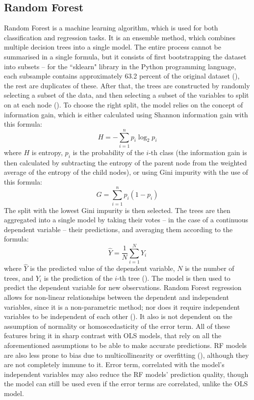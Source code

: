 \documentclass[12pt]{report}
\begin{document}
\subsection{Random Forest}
Random Forest is a machine learning algorithm, which is used for both classification and regression tasks. It is an ensemble method, which combines multiple decision trees into a single model. The entire process cannot be summarised in a single formula, but it consists of first bootstrapping the dataset into subsets -- for the ``sklearn" library in the Python programming language, each subsample contains approximately 63.2 percent of the original dataset (\cite{Steorts15}), the rest are duplicates of these. After that, the trees are constructed by randomly selecting a subset of the data, and then selecting a subset of the variables to split on at each node (\cite[p.160]{cutler2011}). To choose the right split, the model relies on the concept of information gain, which is either calculated using Shannon information gain with this formula:
\begin{equation}
	H = -\sum_{i=1}^{n} p_i \log_2 p_i
\end{equation}
where $H$ is entropy, $p_i$ is the probability of the $i$-th class (the information gain is then calculated by subtracting the entropy of the parent node from the weighted average of the entropy of the child nodes), or using Gini impurity with the use of this formula:
\begin{equation}
	G = \sum_{i=1}^{n} p_i (1 - p_i)
\end{equation}
The split with the lowest Gini impurity is then selected. The trees are then aggregated into a single model by taking their votes -- in the case of a continuous dependent variable -- their predictions, and averaging them according to the formula:
\begin{equation}
	\hat{Y} = \frac{1}{N} \sum_{i=1}^{N} Y_i
\end{equation}
where $\hat{Y}$ is the predicted value of the dependent variable, $N$ is the number of trees, and $Y_i$ is the prediction of the $i$-th tree (\cite[p. 159]{cutler2011}). The model is then used to predict the dependent variable for new observations.
Random Forest regression allows for non-linear relationships between the dependent and independent variables, since it is a non-parametric method; nor does it require independent variables to be independent of each other (\cite{Stekhoven2011}). It also is not dependent on the assumption of normality or homoscedasticity of the error term. All of these features bring it in sharp contrast with OLS models, that rely on all the aforementioned assumptions to be able to make accurate predictions. RF models are also less prone to bias due to multicollinearity or overfitting (\cite{lindner2022}), although they are not completely immune to it. Error term, correlated with the model's independent variables may also reduce the RF models' prediction quality, though the model can still be used even if the error terms are correlated, unlike the OLS model.
\end{document}
